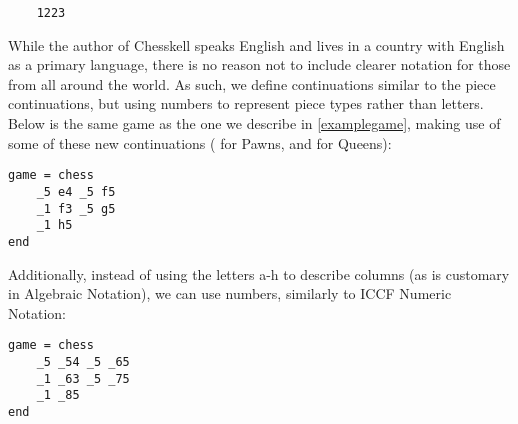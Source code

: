 \begin{verbatim}
    1223
\end{verbatim}

While the author of Chesskell speaks English and lives in a country with English as a primary language, there is no reason not to include clearer notation for those from all around the world. As such, we define continuations similar to the piece continuations, but using numbers to represent piece types rather than letters. Below is the same game as the one we describe in \cref{examplegame}, making use of some of these new continuations ( for Pawns, and  for Queens):

\begin{lstlisting}
game = chess
    _5 e4 _5 f5
    _1 f3 _5 g5
    _1 h5
end
\end{lstlisting}

Additionally, instead of using the letters a-h to describe columns (as is customary in Algebraic Notation), we can use numbers, similarly to ICCF Numeric Notation:

\begin{lstlisting}
game = chess
    _5 _54 _5 _65
    _1 _63 _5 _75
    _1 _85
end
\end{lstlisting}
